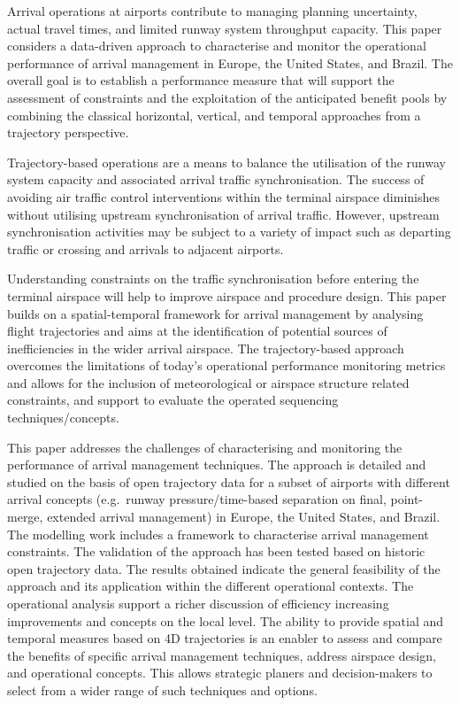 \documentclass[
  journal,
]{IEEEtran}%
\begin{document}
Arrival operations at airports contribute to managing planning
uncertainty, actual travel times, and limited runway system throughput
capacity. This paper considers a data-driven approach to characterise
and monitor the operational performance of arrival management in Europe,
the United States, and Brazil. The overall goal is to establish a
performance measure that will support the assessment of constraints and
the exploitation of the anticipated benefit pools by combining the
classical horizontal, vertical, and temporal approaches from a
trajectory perspective.

Trajectory-based operations are a means to balance the utilisation of
the runway system capacity and associated arrival traffic
synchronisation. The success of avoiding air traffic control
interventions within the terminal airspace diminishes without utilising
upstream synchronisation of arrival traffic. However, upstream
synchronisation activities may be subject to a variety of impact such as
departing traffic or crossing and arrivals to adjacent airports.

Understanding constraints on the traffic synchronisation before entering
the terminal airspace will help to improve airspace and procedure
design. This paper builds on a spatial-temporal framework for arrival
management by analysing flight trajectories and aims at the
identification of potential sources of inefficiencies in the wider
arrival airspace. The trajectory-based approach overcomes the
limitations of today's operational performance monitoring metrics and
allows for the inclusion of meteorological or airspace structure related
constraints, and support to evaluate the operated sequencing
techniques/concepts.

This paper addresses the challenges of characterising and monitoring the
performance of arrival management techniques. The approach is detailed
and studied on the basis of open trajectory data for a subset of
airports with different arrival concepts (e.g.~runway
pressure/time-based separation on final, point-merge, extended arrival
management) in Europe, the United States, and Brazil. The modelling work
includes a framework to characterise arrival management constraints. The
validation of the approach has been tested based on historic open
trajectory data. The results obtained indicate the general feasibility
of the approach and its application within the different operational
contexts. The operational analysis support a richer discussion of
efficiency increasing improvements and concepts on the local level. The
ability to provide spatial and temporal measures based on 4D
trajectories is an enabler to assess and compare the benefits of
specific arrival management techniques, address airspace design, and
operational concepts. This allows strategic planers and decision-makers
to select from a wider range of such techniques and options.
\end{document}
